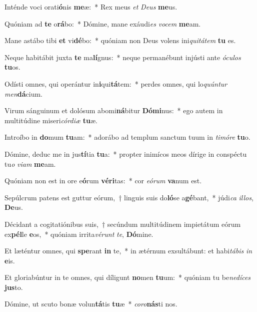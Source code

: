 \item Inténde voci orati\textbf{ó}nis \textbf{me}æ:~* Rex meus \textit{et} \textit{De}\textit{us} \textbf{me}us.
\item Quóniam ad \textbf{te} o\textbf{rá}bo:~* Dómine, mane exáudi\textit{es} \textit{vo}\textit{cem} \textbf{me}am.
\item Mane astábo tibi \textbf{et} vi\textbf{dé}bo:~* quóniam non Deus volens ini\textit{qui}\textit{tá}\textit{tem} \textbf{tu} es.
\item Neque habitábit juxta \textbf{te} ma\textbf{lí}gnus:~* neque permanébunt injústi ante \textit{ó}\textit{cu}\textit{los} \textbf{tu}os.
\item Odísti omnes, qui operántur in\textbf{i}qui\textbf{tá}tem:~* perdes omnes, qui lo\textit{quún}\textit{tur} \textit{men}\textbf{dá}cium.
\item Virum sánguinum et dolósum abomi\textbf{ná}bitur \textbf{Dó}\textbf{mi}nus:~* ego autem in multitúdine miseri\textit{cór}\textit{di}\textit{æ} \textbf{tu}æ.
\item Introíbo in \textbf{do}mum \textbf{tu}am:~* adorábo ad templum sanctum tuum in \textit{ti}\textit{mó}\textit{re} \textbf{tu}o.
\item Dómine, deduc me in jus\textbf{tí}tia \textbf{tu}a:~* propter inimícos meos dírige in conspéctu tu\textit{o} \textit{vi}\textit{am} \textbf{me}am.
\item Quóniam non est in ore e\textbf{ó}rum \textbf{vé}\textbf{ri}tas:~* cor \textit{e}\textit{ó}\textit{rum} \textbf{va}num est.
\item Sepúlcrum patens est guttur eórum,~† linguis suis do\textbf{ló}se a\textbf{gé}bant,~* júdi\textit{ca} \textit{il}\textit{los}, \textbf{De}us.
\item Décidant a cogitatiónibus suis,~† secúndum multitúdinem impietátum eórum ex\textbf{pél}le \textbf{e}os,~* quóniam irrita\textit{vé}\textit{runt} \textit{te}, \textbf{Dó}mine.
\item Et læténtur omnes, qui \textbf{spe}rant \textbf{in} te,~* in ætérnum exsultábunt: et habi\textit{tá}\textit{bis} \textit{in} \textbf{e}is.
\item Et gloriabúntur in te omnes, qui díligunt \textbf{no}men \textbf{tu}um:~* quóniam tu be\textit{ne}\textit{dí}\textit{ces} \textbf{jus}to.
\item Dómine, ut scuto bonæ volun\textbf{tá}tis \textbf{tu}æ~* \textit{co}\textit{ro}\textbf{nás}ti nos.
